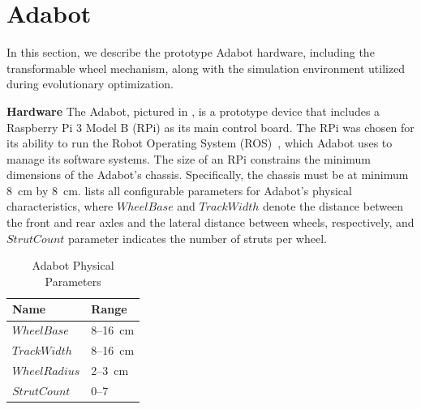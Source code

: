 \section{Adabot}
\label{sec:adabot}

In this section, we describe the prototype Adabot hardware, including the transformable wheel mechanism, along with the simulation environment utilized during evolutionary optimization.

\vspace{0.1in}
\noindent
\textbf{Hardware}
%
The Adabot, pictured in , is a prototype device that includes a Raspberry Pi 3 Model B (RPi) as its main control board.
%
The RPi was chosen for its ability to run the Robot Operating System (ROS)~\autocite{Quigley.ICRAOSS.ROS.2009}, which Adabot uses to manage its software systems.
%
The size of an RPi constrains the minimum dimensions of the Adabot's chassis. Specifically, the chassis must be at minimum 8~\si{cm} by 8~\si{cm}.
%
 lists all configurable parameters for Adabot's physical characteristics, where
$\mathit{WheelBase}$ and $\mathit{TrackWidth}$ denote the distance between the front and rear axles and the lateral distance between wheels, respectively, and $\mathit{StrutCount}$ parameter indicates the number of struts per wheel.

\begin{table}[hb]
    \centering
    \caption{Adabot Physical Parameters}
    \label{tbl:params-physical}
    \begin{tabular}{@{}ll@{}}
        \toprule
        \textbf{Name} & \textbf{Range}\\
        \midrule
        $\mathit{WheelBase}$    & \numrange{8}{16}~\si{cm}\\
        $\mathit{TrackWidth}$    & \numrange{8}{16}~\si{cm}\\
        $\mathit{WheelRadius}$ & \numrange{2}{3}~\si{cm}\\
        $\mathit{StrutCount}$        & \numrange{0}{7}\\
        \bottomrule
    \end{tabular}
\end{table}



